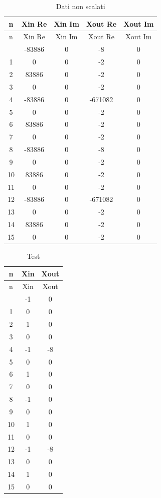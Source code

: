 \documentclass[a4paper, titlepage]{article}
\begin{document}
\begin{longtable}{*5c}
\caption{Dati non scalati}
\label{}\\
\toprule
n & Xin Re & Xin Im & Xout Re & Xout Im \\
\midrule
\endfirsthead
n & Xin Re & Xin Im & Xout Re & Xout Im \\
\midrule
\endhead
\midrule
\endfoot
\bottomrule
\endlastfoot
0 & -83886 & 0 & -8 & 0\\
1 & 0    & 0 & -2 & 0 \\
2 & 83886    & 0 & -2 & 0 \\
3 & 0    & 0 & -2 & 0 \\
4 & -83886    & 0 & -671082 & 0 \\
5 & 0    & 0 & -2 & 0 \\
6 & 83886    & 0 & -2 & 0 \\
7 & 0    & 0 & -2 & 0 \\
8 & -83886    & 0 & -8 & 0 \\
9 & 0    & 0 & -2 & 0 \\
10& 83886    & 0 & -2 & 0 \\
11& 0    & 0 & -2 & 0 \\
12& -83886    & 0 & -671082 & 0 \\
13& 0    & 0 & -2 & 0 \\
14& 83886    & 0 & -2 & 0 \\
15 & 0 & 0 & -2 & 0 \\ 
\end{longtable}
\begin{longtable}{*3c}
\caption{Test}
\label{}\\
\toprule
n & Xin & Xout\\
\midrule
\endfirsthead
n & Xin & Xout\\
\midrule
\endhead
\midrule
\endfoot
\bottomrule
\endlastfoot
0 & -1& 0\\
1 & 0& 0\\
2 & 1& 0\\
3 & 0& 0\\
4 & -1& -8\\
5 & 0& 0\\
6 & 1& 0\\
7 & 0& 0 \\
8 & -1& 0 \\
9 & 0& 0\\
10& 1& 0\\
11& 0& 0\\
12& -1& -8\\
13& 0& 0\\
14& 1& 0\\
15& 0& 0\\ 
\end{longtable}
\newpage
\end{document}
